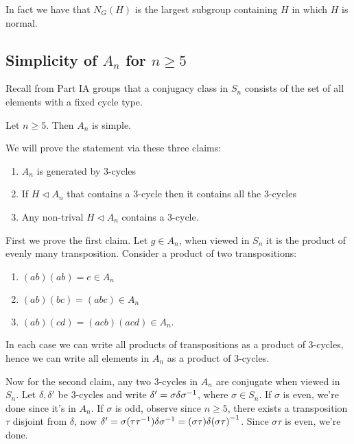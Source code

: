 \documentclass{article}
\newcommand{\nrm}{\triangleleft}
\begin{document}
\par
In fact we have that $ N_G(H) $ is the largest subgroup containing $ H $ in which $ H $ is normal.
\subsection{Simplicity of $ A_n $ for $ n\ge 5 $}
Recall from Part IA groups that a conjugacy class in $ S_n $ consists of the set of all elements with a fixed cycle type.
\begin{theorem}
  Let $ n\ge 5 $. Then $ A_n $ is simple.
\end{theorem}
\pf We will prove the statement via these three claims:
\begin{enumerate}
	\item $ A_n $ is generated by 3-cycles
	\item If $ H\nrm A_n $ that contains a 3-cycle then it contains all the 3-cycles
	\item Any non-trival $ H\nrm A_n $ contains a 3-cycle.
\end{enumerate}
First we prove the first claim. Let $ g\in A_n $, when viewed in $ S_n $ it is the product of evenly many transposition. Consider a product of two transpositions:
\begin{enumerate}
	\item $ (ab)(ab)=e\in A_n $
	\item $ (ab)(bc)=(abc)\in A_n $
	\item $ (ab)(cd)=(acb)(acd)\in A_n $.
\end{enumerate}
In each case we can write all products of transpositions as a product of 3-cycles, hence we can write all elements in $ A_n $ as a product of 3-cycles.

\par
Now for the second claim, any two 3-cycles in $ A_n $ are conjugate when viewed in $ S_n $. Let $ \delta, \delta' $ be 3-cycles and write $ \delta' =\sigma\delta{\sigma}^{-1} $, where $ \sigma\in S_n $. If $ \sigma $ is even, we're done since it's in $ A_n $. If $ \sigma $ is odd, observe since $ n\ge 5 $, there exists a transposition $ \tau $ disjoint from $ \delta $, now $ \delta'=\sigma(\tau{\tau}^{-1})\delta{\sigma}^{-1}=(\sigma\tau)\delta{(\sigma\tau)}^{-1} $. Since $ \sigma\tau $ is even, we're done.
\end{document}
